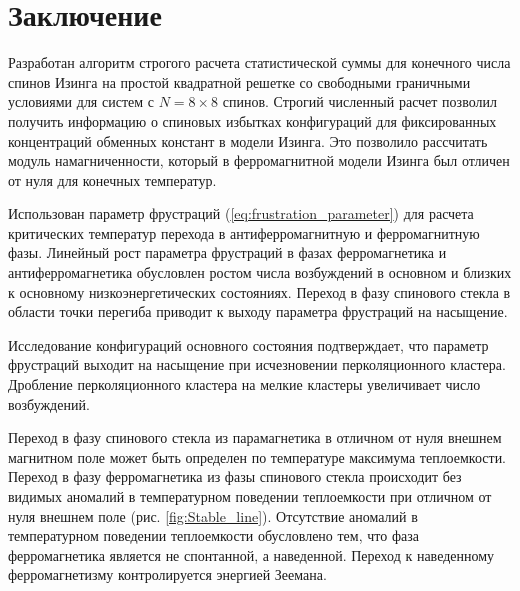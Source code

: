 \chapter*{Заключение}                       %


%

Разработан алгоритм строгого расчета статистической суммы для конечного числа спинов Изинга на простой квадратной решетке со свободными граничными условиями для систем с $N=8\times8$ спинов. Строгий численный расчет позволил получить информацию о спиновых избытках конфигураций для фиксированных концентраций обменных констант в модели Изинга. Это позволило рассчитать модуль намагниченности, который в ферромагнитной модели Изинга был отличен от нуля для конечных температур.

Использован параметр фрустраций (\ref{eq:frustration_parameter}) для расчета критических температур перехода в антиферромагнитную и ферромагнитную фазы. Линейный рост параметра фрустраций в фазах ферромагнетика и антиферромагнетика обусловлен ростом числа возбуждений в основном и близких к основному низкоэнергетических состояниях. Переход в фазу спинового стекла в области точки перегиба приводит к выходу параметра фрустраций на насыщение. 

Исследование конфигураций основного состояния подтверждает, что параметр фрустраций выходит на насыщение при исчезновении перколяционного кластера. Дробление перколяционного кластера на мелкие кластеры увеличивает число возбуждений.

Переход в фазу спинового стекла из парамагнетика в отличном от нуля внешнем магнитном поле может быть определен по температуре максимума теплоемкости. Переход в фазу ферромагнетика из фазы спинового стекла происходит без видимых аномалий в температурном поведении теплоемкости при отличном от нуля внешнем поле (рис. \ref{fig:Stable_line}). Отсутствие аномалий в температурном поведении теплоемкости обусловлено тем, что фаза ферромагнетика является не спонтанной, а наведенной. Переход к наведенному ферромагнетизму контролируется энергией Зеемана. 

